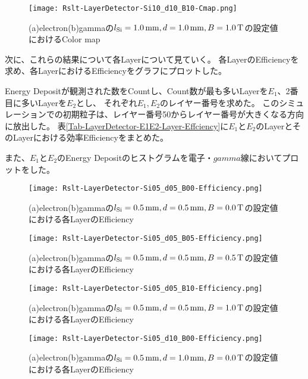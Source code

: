 \documentclass[a4paper,10pt]{jreport}
\begin{document}
\begin{figure}[H]
	\center
	\texttt{[image: Rslt-LayerDetector-Si10\_d10\_B10-Cmap.png]}
	\caption{(a)electron(b)gammaの$l_{\rm{Si}}=\SI{1.0}{mm}, d=\SI{1.0}{mm}, B=\SI{1.0}{T}$の設定値におけるColor map}
	\label{Rslt-LayerDetector-Si05_d05_B00-Cmap}
\end{figure}

次に、これらの結果について各Layerについて見ていく。
各LayerのEfficiencyを求め、各LayerにおけるEfficiencyをグラフにプロットした。

Energy Depositが観測された数をCountし、Count数が最も多いLayerを$E_1$、2番目に多いLayerを$E_2$とし、
それぞれ$E_1,E_2$のレイヤー番号を求めた。
このシミュレーションでの初期粒子は、レイヤー番号50からレイヤー番号が大きくなる方向に放出した。
表\ref{Tab-LayerDetector-E1E2-Layer-Effciency}に$E_1$と$E_2$のLayerとそのLayerにおける効率Efficiencyをまとめた。

また、$E_1$と$E_2$のEnergy Depositのヒストグラムを電子・$gamma$線においてプロットをした。

\begin{figure}[H]
	\center
	\texttt{[image: Rslt-LayerDetector-Si05\_d05\_B00-Efficiency.png]}
	\caption{(a)electron(b)gammaの$l_{\rm{Si}}=\SI{0.5}{mm}, d=\SI{0.5}{mm}, B=\SI{0.0}{T}$の設定値における各LayerのEfficiency}
	\label{Rslt-LayerDetector-Si05_d05_B00-Efficiency}
\end{figure}

\begin{figure}[H]
	\center
	\texttt{[image: Rslt-LayerDetector-Si05\_d05\_B05-Efficiency.png]}
	\caption{(a)electron(b)gammaの$l_{\rm{Si}}=\SI{0.5}{mm}, d=\SI{0.5}{mm}, B=\SI{0.5}{T}$の設定値における各LayerのEfficiency}
	\label{Rslt-LayerDetector-Si05_d05_B05-Efficiency}
\end{figure}

\begin{figure}[H]
	\center
	\texttt{[image: Rslt-LayerDetector-Si05\_d05\_B10-Efficiency.png]}
	\caption{(a)electron(b)gammaの$l_{\rm{Si}}=\SI{0.5}{mm}, d=\SI{0.5}{mm}, B=\SI{1.0}{T}$の設定値における各LayerのEfficiency}
	\label{Rslt-LayerDetector-Si05_d05_B10-Efficiency}
\end{figure}

\begin{figure}[H]
	\center
	\texttt{[image: Rslt-LayerDetector-Si05\_d10\_B00-Efficiency.png]}
	\caption{(a)electron(b)gammaの$l_{\rm{Si}}=\SI{0.5}{mm}, d=\SI{1.0}{mm}, B=\SI{0.0}{T}$の設定値における各LayerのEfficiency}
	\label{Rslt-LayerDetector-Si05_d10_B00-Efficiency}
\end{figure}
\end{document}
